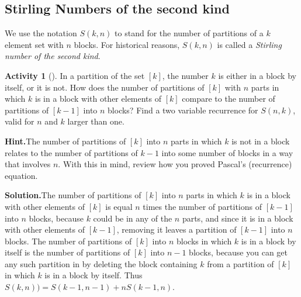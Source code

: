 \documentclass[10pt,]{book}
\theoremstyle{plain}
\theoremstyle{definition}
\newtheorem{activity}[project]{Activity}
\numberwithin{equation}{chapter}
\begin{document}
\subsection[{Stirling Numbers of the second kind}]{Stirling Numbers of the second kind}\label{subsection-33}
We use the notation \(S(k,n)\) to stand for the number of partitions of a \(k\) element set with \(n\) blocks. For historical reasons, \(S(k,n)\) is called a \emph{Stirling number of the second kind}. %
\begin{activity}[]\label{secondstirlingrecurrence}
In a partition of the set \([k]\), the number \(k\) is either in a block by itself, or it is not. How does the number of partitions of \([k]\) with \(n\) parts in which \(k\) is in a block with other elements of \([k]\) compare to the number of partitions of \([k-1]\) into \(n\) blocks? Find a two variable recurrence for \(S(n,k)\), valid for \(n\) and \(k\) larger than one.%
\par\medskip\noindent%
\textbf{Hint.}\quad The number of partitions of \([k]\) into \(n\) parts in which \(k\) is not in a block relates to the number of partitions of \(k-1\) into some number of blocks in a way that involves \(n\). With this in mind, review how you proved Pascal's (recurrence) equation.%
\par\medskip\noindent%
\textbf{Solution.}\quad The number of partitions of \([k]\) into \(n\) parts in which \(k\) is in a block with other elements of \([k]\) is equal \(n\) times the number of partitions of \([k-1]\) into \(n\) blocks, because \(k\) could be in any of the \(n\) parts, and since it is in a block with other elements of \([k-1]\), removing it leaves a partition of \([k-1]\) into \(n\) blocks. The number of partitions of \([k]\) into \(n\) blocks in which \(k\) is in a block by itself is the number of partitions of \([k]\) into \(n-1\) blocks, because you can get any such partition in by deleting the block containing \(k\) from a partition of \([k]\) in which \(k\) is in a block by itself. Thus \(S(k,n))=S(k-1,n-1) +nS(k-1,n)\).%
\end{activity}
\end{document}
